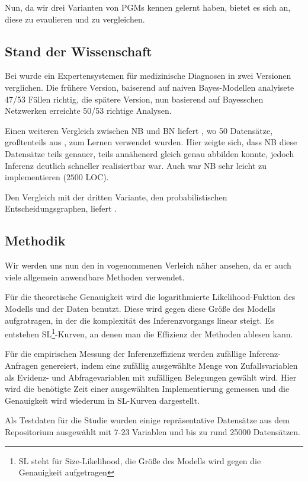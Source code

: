 \documentclass{llncs}
\begin{document}
Nun, da wir drei Varianten von PGMs kennen gelernt haben, bietet es sich an, diese zu evaulieren und zu vergleichen. 

\subsection{Stand der Wissenschaft}

Bei \cite{heckerman1992evaluation} wurde ein Expertensystemen für medizinische Diagnosen in zwei Versionen verglichen. Die frühere Version, baiserend auf naiven Bayes-Modellen analyisete 47/53 Fällen richtig, die spätere Version, nun basierend auf Bayesschen Netzwerken erreichte 50/53 richtige Analysen. 

Einen weiteren Vergleich zwischen NB und BN liefert \cite{lowd2005naive}, wo 50 Datensätze, großtenteils aus \cite{bache2013machine}, zum Lernen verwendet wurden. Hier zeigte sich, dass NB diese Datensätze teils genauer, teils annähenerd gleich genau abbilden konnte, jedoch Inferenz deutlich schneller realisiertbar war. Auch war NB sehr leicht zu implementieren ($2500$ LOC). 

Den Vergleich mit der dritten Variante, den probabilistischen Entscheidungsgraphen, liefert \cite{nielsen2006empirical}.

\subsection{Methodik}

Wir werden uns nun den in \cite{nielsen2006empirical} vogenommenen Verleich näher ansehen, da er auch viele allgemein anwendbare Methoden verwendet. 

Für die theoretische Genauigkeit wird die logarithmierte Likelihood-Fuktion des Modells und der Daten benutzt. Diese wird gegen diese Größe des Modells aufgratragen, in der die komplexität des Inferenzvorgangs linear steigt. Es entstehen SL\footnote{SL steht für Size-Likelihood, die Größe des Modells wird gegen die Genauigkeit aufgetragen}-Kurven, an denen man die Effizienz der Methoden ablesen kann. 

Für die empirischen Messung der Inferenzeffizienz werden zufällige Inferenz-Anfragen genereiert, indem eine zufällig ausgewählte Menge von Zufallsvariablen als Evidenz- und Abfragevariablen mit zufälligen Belegungen gewählt wird. Hier wird die benötigte Zeit einer ausgewählten Implementierung gemessen und die Genauigkeit wird wiederum in SL-Kurven dargestellt. 

Als Testdaten für die Studie wurden einige repräsentative Datensätze aus dem Repositorium \cite{bache2013machine} ausgewählt mit 7-23 Variablen und bis zu rund 25000 Datensätzen. 
\end{document}
